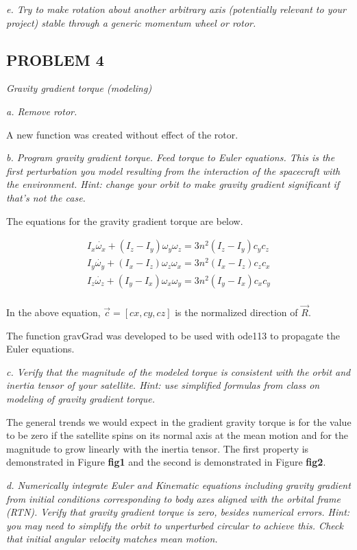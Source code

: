 \textit{e. Try to make rotation about another arbitrary axis (potentially relevant to your project) stable through a generic momentum wheel or rotor.}

\subsection{PROBLEM 4}
\textit{Gravity gradient torque (modeling)}

\textit{a. Remove rotor.}

A new function was created without effect of the rotor.

\textit{b. Program gravity gradient torque. Feed torque to Euler equations. This is the first perturbation you model resulting from the interaction of the spacecraft with the environment. Hint: change your orbit to make gravity gradient significant if that’s not the case.}

The equations for the gravity gradient torque are below.

\begin{align*}
    I_x \dot{\omega_x} + (I_z - I_y) \omega_y \omega_z = 3 n^2 (I_z - I_y) c_y c_z \\
    I_y \dot{\omega_y} + (I_x - I_z) \omega_z \omega_x = 3 n^2 (I_x - I_z) c_z c_x \\
    I_z \dot{\omega_z} + (I_y - I_x) \omega_x \omega_y = 3 n^2 (I_y - I_x) c_x c_y \\
\end{align*}

In the above equation, $\Vec{c} = [cx, cy, cz]$ is the normalized direction of $\Vec{R}$.

The function gravGrad was developed to be used with ode113 to propagate the Euler equations.



\textit{c. Verify that the magnitude of the modeled torque is consistent with the orbit and inertia tensor of your satellite. Hint: use simplified formulas from class on modeling of gravity gradient torque.}

The general trends we would expect in the gradient gravity torque is for the value to be zero if the satellite spins on its normal axis at the mean motion and for the magnitude to grow linearly with the inertia tensor. The first property is demonstrated in Figure \textbf{fig1} and the second is demonstrated in Figure \textbf{fig2}.

\textit{d. Numerically integrate Euler and Kinematic equations including gravity gradient from initial conditions corresponding to body axes aligned with the orbital frame (RTN). Verify that gravity gradient torque is zero, besides numerical errors. Hint: you may need to simplify the orbit to unperturbed circular to achieve this. Check that initial angular velocity matches mean motion.}

